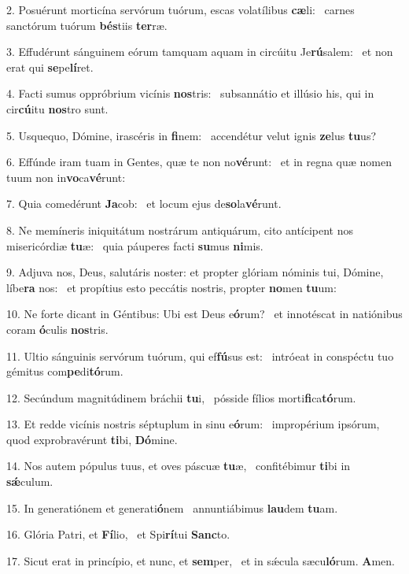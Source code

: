 2. Posuérunt morticína servórum tuórum, escas volatílibus \textbf{cæ}li: \ast\  carnes sanctórum tuórum \textbf{bés}tiis \textbf{ter}ræ.\

3. Effudérunt sánguinem eórum tamquam aquam in circúitu Je\textbf{rú}salem: \ast\  et non erat qui \textbf{se}pe\textbf{lí}ret.\

4. Facti sumus oppróbrium vicínis \textbf{nos}tris: \ast\  subsannátio et illúsio his, qui in cir\textbf{cú}itu \textbf{nos}tro sunt.\

5. Usquequo, Dómine, irascéris in \textbf{fi}nem: \ast\  accendétur velut ignis \textbf{ze}lus \textbf{tu}us?\

6. Effúnde iram tuam in Gentes, quæ te non no\textbf{vé}runt: \ast\  et in regna quæ nomen tuum non in\textbf{vo}ca\textbf{vé}runt:\

7. Quia comedérunt \textbf{Ja}cob: \ast\  et locum ejus de\textbf{so}la\textbf{vé}runt.\

8. Ne memíneris iniquitátum nostrárum antiquárum, cito antícipent nos misericórdiæ \textbf{tu}æ: \ast\  quia páuperes facti \textbf{su}mus \textbf{ni}mis.\

9. Adjuva nos, Deus, salutáris noster: et propter glóriam nóminis tui, Dómine, líbe\textbf{ra} nos: \ast\  et propítius esto peccátis nostris, propter \textbf{no}men \textbf{tu}um:\

10. Ne forte dicant in Géntibus: Ubi est Deus e\textbf{ó}rum? \ast\  et innotéscat in natiónibus coram \textbf{ó}culis \textbf{nos}tris.\

11. Ultio sánguinis servórum tuórum, qui ef\textbf{fú}sus est: \ast\  intróeat in conspéctu tuo gémitus com\textbf{pe}di\textbf{tó}rum.\

12. Secúndum magnitúdinem bráchii \textbf{tu}i, \ast\  pósside fílios morti\textbf{fi}ca\textbf{tó}rum.\

13. Et redde vicínis nostris séptuplum in sinu e\textbf{ó}rum: \ast\  impropérium ipsórum, quod exprobravérunt \textbf{ti}bi, \textbf{Dó}mine.\

14. Nos autem pópulus tuus, et oves páscuæ \textbf{tu}æ, \ast\  confitébimur \textbf{ti}bi in \textbf{sǽ}culum.\

15. In generatiónem et generati\textbf{ó}nem \ast\  annuntiábimus \textbf{lau}dem \textbf{tu}am.\

16. Glória Patri, et \textbf{Fí}lio, \ast\  et Spi\textbf{rí}tui \textbf{Sanc}to.\

17. Sicut erat in princípio, et nunc, et \textbf{sem}per, \ast\  et in sǽcula sæcu\textbf{ló}rum. \textbf{A}men.\

